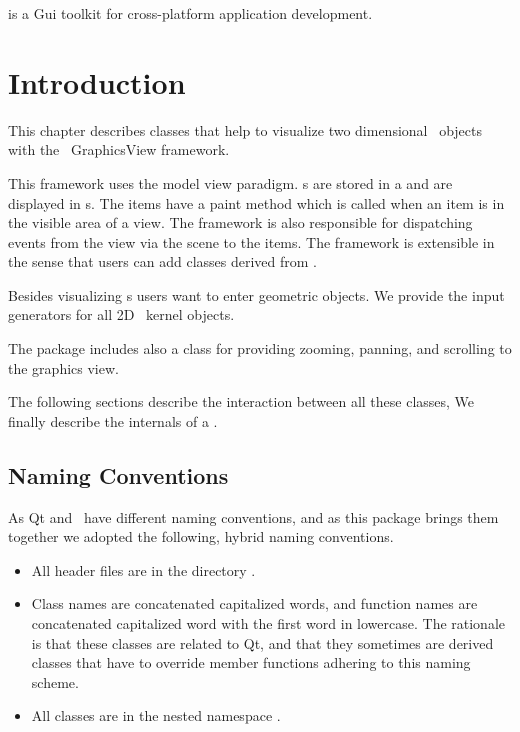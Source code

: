 

 is a
{\sc Gui} toolkit for
cross-platform application development.

\section{Introduction}

This chapter describes classes that help to visualize two dimensional \cgal\ objects
with the \qt\ GraphicsView framework.

This framework uses the model view paradigm. s are stored in a 
 and are displayed in s. The items 
have a paint method which is called when an item is in the visible area of a view.
The framework is also responsible for dispatching events from the view
via the scene to the items. The framework is extensible in the sense
that users can add classes derived from .

Besides visualizing s users want to enter geometric objects.
We provide the input generators for all 2D \cgal\ kernel objects.

The package includes also a class for providing zooming, panning, and scrolling
to the graphics view.


The following sections describe the interaction between all these classes,
We finally describe the internals of a .

\subsection{Naming Conventions}

As Qt and \cgal\ have different naming conventions, and as this package
brings them together we adopted the following, hybrid naming conventions.

\begin{itemize}
\item All header files are in the directory . 
\item Class names are concatenated capitalized words, and function names are
      concatenated capitalized word with the first word in lowercase. The rationale is that
      these classes are related to Qt, and that they sometimes are derived
      classes that have to override member functions adhering to this naming scheme.
\item All classes are in the nested namespace .
\end{itemize}
 


